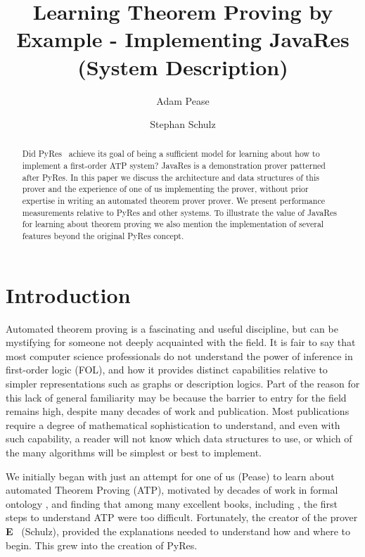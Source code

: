 \documentclass{llncs}
\title{Learning Theorem Proving by Example - Implementing JavaRes (System Description)}
\author{Adam Pease\inst{1}\orcid{0000-0001-9772-1266}
        \and Stephan Schulz\inst{2}\orcid{0000-0001-6262-8555}
  }
\institute{
  Articulate Software, USA,
  \email{\tt apease@articulatesoftware.com}
  \and
  DHBW Stuttgart, Germany,
  \email{\tt schulz@eprover.org}
}
\begin{document}
\maketitle


\begin{abstract}
  Did PyRes~\cite{SP:IJCAR-2020} achieve its goal of being a
  sufficient model for learning about how to implement a first-order
  ATP system?  JavaRes is a demonstration prover patterned after
  PyRes.  In this paper we discuss the architecture and data
  structures of this prover and the experience of one of us
  implementing the prover, without prior expertise in writing an
  automated theorem prover prover.  We present performance
  measurements relative to PyRes and other systems.  To illustrate the
  value of JavaRes for learning about theorem proving we also mention
  the implementation of several features beyond the original PyRes
  concept.
\end{abstract}

\section{Introduction}

Automated theorem proving is a fascinating and useful discipline, but
can be mystifying for someone not deeply acquainted with the field.
It is fair to say that most computer science professionals do not
understand the power of inference in first-order logic (FOL), and how
it provides distinct capabilities relative to simpler representations
such as graphs or description logics.  Part of the reason for this
lack of general familiarity may be because the barrier to entry for
the field remains high, despite many decades of work and publication.
Most publications require a degree of mathematical sophistication to
understand, and even with such capability, a reader will not know
which data structures to use, or which of the many algorithms will be
simplest or best to implement.

We initially began with just an attempt for one of us (Pease) to learn
about automated Theorem Proving (ATP), motivated by decades of work in
formal ontology \cite{np01,p11}, and finding that among many excellent
books, including \cite{Harrison:HPL-2009}, the first steps to
understand ATP were too difficult.  Fortunately, the creator of the
prover \textbf{E}~\cite{Schulz:AICOM-2002,SCV:CADE-2019} (Schulz),
provided the explanations needed to understand how and where to begin.
This grew into the creation of PyRes.
\end{document}
